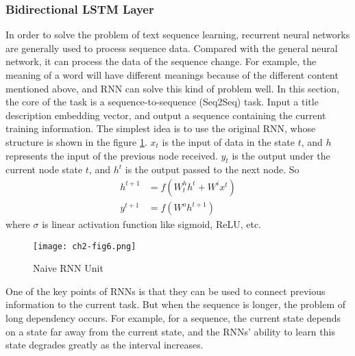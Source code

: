 \subsubsection{Bidirectional LSTM Layer}


In order to solve the problem of text sequence learning, recurrent neural networks are generally used to process sequence data. Compared with the general neural network, it can process the data of the sequence change. For example, the meaning of a word will have different meanings because of the different content mentioned above, and RNN can solve this kind of problem well. In this section, the core of the task is a sequence-to-sequence (Seq2Seq) task. Input a title description embedding vector, and output a sequence containing the current training information. The simplest idea is to use the original RNN, whose structure is shown in the figure \ref{ch2-fig6}. \(x_t\) is the input of data in the state \(t\), and \(h\) represents the input of the previous node received. \(y_t\) is the output under the current node state \(t\), and \(h^{t}\) is the output passed to the next node. So
\begin{align}
	h^{t+1} & =f(W^h_{t} h^t+W^i x^t) \\
	y^{t+1} & =f(W^o h^{t+1})
\end{align}
where \(\sigma\) is linear activation function like sigmoid, ReLU, etc.

\begin{figure}[h]
	\centering
	\texttt{[image: ch2-fig6.png]}
	\caption{Naive RNN Unit}
	\label{ch2-fig6}
\end{figure}

One of the key points of RNNs is that they can be used to connect previous information to the current task. But when the sequence is longer, the problem of long dependency occurs. For example, for a sequence, the current state depends on a state far away from the current state, and the RNNs' ability to learn this state degrades greatly as the interval increases.

